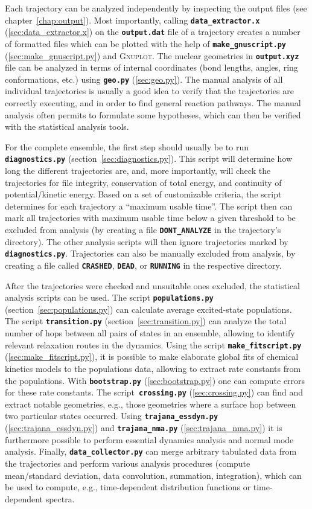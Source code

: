 \documentclass[a4paper,10pt,DIV=15,openany,twoside=false]{scrbook}
\newcommand{\ttt}[1]{\textbf{\texttt{#1}}}
\begin{document}
Each trajectory can be analyzed independently by inspecting the output files (see chapter~\ref{chap:output}). Most importantly, calling \ttt{data\_extractor.x} (\ref{sec:data_extractor.x}) on the \ttt{output.dat} file of a trajectory creates a number of formatted files which can be plotted with the help of \ttt{make\_gnuscript.py} (\ref{sec:make_gnuscript.py}) and \textsc{Gnuplot}.
The nuclear geometries in \ttt{output.xyz} file can be analyzed in terms of internal coordinates (bond lengths, angles, ring conformations, etc.) using \ttt{geo.py} (\ref{sec:geo.py}).
The manual analysis of all individual trajectories is usually a good idea to verify that the trajectories are correctly executing, and in order to find general reaction pathways.
The manual analysis often permits to formulate some hypotheses, which can then be verified with the statistical analysis tools.

For the complete ensemble, the first step should usually be to run \ttt{diagnostics.py} (section~\ref{sec:diagnostics.py}).
This script will determine how long the different trajectories are, and, more importantly, will check the trajectories for file integrity, conservation of total energy, and continuity of potential/kinetic energy.
Based on a set of customizable criteria, the script determines for each trajectory a ``maximum usable time''.
The script then can mark all trajectories with maximum usable time below a given threshold to be excluded from analysis (by creating a file \ttt{DONT\_ANALYZE} in the trajectory's directory).
The other analysis scripts will then ignore trajectories marked by \ttt{diagnostics.py}.
Trajectories can also be manually excluded from analysis, by creating a file called \ttt{CRASHED}, \ttt{DEAD}, or \ttt{RUNNING} in the respective directory.

After the trajectories were checked and unsuitable ones excluded, the statistical analysis scripts can be used.
The script \ttt{populations.py} (section~\ref{sec:populations.py}) can calculate average excited-state populations. 
The script \ttt{transition.py} (section~\ref{sec:transition.py}) can analyze the total number of hops between all pairs of states in an ensemble, allowing to identify relevant relaxation routes in the dynamics.
Using the script \ttt{make\_fitscript.py} (\ref{sec:make_fitscript.py}), it is possible to make elaborate global fits of chemical kinetics models to the populations data, allowing to extract rate constants from the populations.
With \ttt{bootstrap.py} (\ref{sec:bootstrap.py}) one can compute errors for these rate constants.
The script~\ttt{crossing.py} (\ref{sec:crossing.py}) can find and extract notable geometries, e.g., those geometries where a surface hop between two particular states occurred.
Using \ttt{trajana\_essdyn.py} (\ref{sec:trajana_essdyn.py}) and \ttt{trajana\_nma.py} (\ref{sec:trajana_nma.py}) it is furthermore possible to perform essential dynamics analysis and normal mode analysis.
Finally, \ttt{data\_collector.py} can merge arbitrary tabulated data from the trajectories and perform various analysis procedures (compute mean/standard deviation, data convolution, summation, integration), which can be used to compute, e.g., time-dependent distribution functions or time-dependent spectra.
\end{document}
